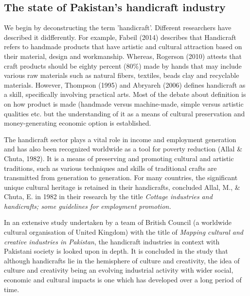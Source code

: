 \subsection{The state of Pakistan's handicraft industry}

We begin by deconstructing the term 'handicraft'. Different researchers have described it didfferently. For example, Fabeil (2014) describes that Handicraft refers to handmade products that have artistic and cultural attraction based on their material, design and workmanship. Whereas, Rogerson (2010) attests that craft products should be eighty percent (80\%) made by hands that may include various raw materials such as natural fibers, textiles, beads clay and recyclable materials. However, Thompson (1995) and Abryareh (2006) defines handicraft as a skill, specifically involving practical arts. Most of the debate about definition is on how product is made (handmade versus machine-made, simple versus artistic qualities etc. but the understanding of it as a means of cultural preservation and money-generating economic option is established.

The handicraft sector plays a vital role in income and employment generation and has also been recognized worldwide as a tool for poverty reduction (Allal \& Chuta, 1982). It is a means of preserving and promoting cultural and artistic traditions, such as various techniques and skills of traditional crafts are transmitted from generation to generation. For many countries, the significant unique cultural heritage is retained in their handicrafts, concluded Allal, M., \& Chuta, E. in 1982 in their research by the title \textit {Cottage industries and handicrafts; some guidelines for employment promotion.}

In an extensive study undertaken by a team of British Council (a worldwide cultural organisation of United Kingdom) with the title of \textit {Mapping cultural and creative industries in Pakistan}, the handicraft industries in context with Pakistani society is looked upon in depth. It is concluded in the study that although handicrafts lie in the hemisphere of culture and creativity, the idea of culture and creativity being an evolving industrial activity with wider social, economic and cultural impacts is one which has developed over a long period of time.

